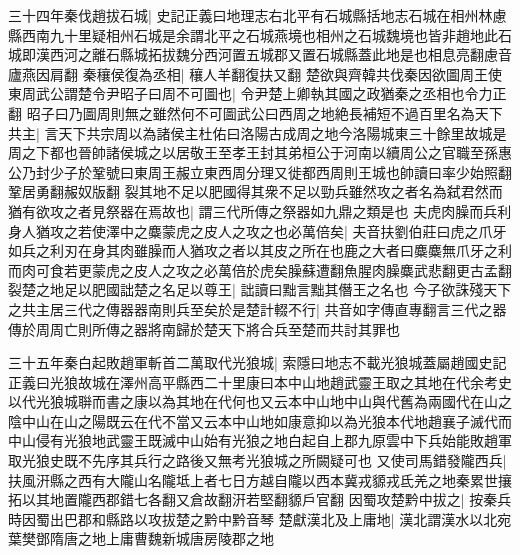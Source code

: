 三十四年秦伐趙拔石城|{
	史記正義曰地理志右北平有石城縣括地志石城在相州林慮縣西南九十里疑相州石城是余謂北平之石城燕境也相州之石城魏境也皆非趙地此石城即漢西河之離石縣城拓拔魏分西河置五城郡又置石城縣蓋此地是也相息亮翻慮音廬燕因肩翻}
秦穰侯復為丞相|{
	穰人羊翻復扶又翻}
楚欲與齊韓共伐秦因欲圖周王使東周武公謂楚令尹昭子曰周不可圖也|{
	令尹楚上卿執其國之政猶秦之丞相也令力正翻}
昭子曰乃圖周則無之雖然何不可圖武公曰西周之地絶長補短不過百里名為天下共主|{
	言天下共宗周以為諸侯主杜佑曰洛陽古成周之地今洛陽城東三十餘里故城是周之下都也晉帥諸侯城之以居敬王至孝王封其弟桓公于河南以續周公之官職至孫惠公乃封少子於鞏號曰東周王赧立東西周分理又徙都西周則王城也帥讀曰率少始照翻鞏居勇翻赧奴版翻}
裂其地不足以肥國得其衆不足以勁兵雖然攻之者名為弑君然而猶有欲攻之者見祭器在焉故也|{
	謂三代所傳之祭器如九鼎之類是也}
夫虎肉臊而兵利身人猶攻之若使澤中之麋蒙虎之皮人之攻之也必萬倍矣|{
	夫音扶劉伯莊曰虎之爪牙如兵之利刃在身其肉雖臊而人猶攻之者以其皮之所在也鹿之大者曰麋麋無爪牙之利而肉可食若更蒙虎之皮人之攻之必萬倍於虎矣臊蘇遭翻魚腥肉臊麋武悲翻更古孟翻}
裂楚之地足以肥國詘楚之名足以尊王|{
	詘讀曰黜言黜其僭王之名也}
今子欲誅殘天下之共主居三代之傳器器南則兵至矣於是楚計輟不行|{
	共音如字傳直專翻言三代之器傳於周周亡則所傳之器將南歸於楚天下將合兵至楚而共討其罪也}


三十五年秦白起敗趙軍斬首二萬取代光狼城|{
	索隱曰地志不載光狼城蓋屬趙國史記正義曰光狼故城在澤州高平縣西二十里康曰本中山地趙武靈王取之其地在代余考史以代光狼城聨而書之康以為其地在代何也又云本中山地中山與代舊為兩國代在山之陰中山在山之陽既云在代不當又云本中山地如康意抑以為光狼本代地趙襄子滅代而中山侵有光狼地武靈王既滅中山始有光狼之地白起自上郡九原雲中下兵始能敗趙軍取光狼史既不先序其兵行之路後又無考光狼城之所闕疑可也}
又使司馬錯發隴西兵|{
	扶風汧縣之西有大隴山名隴坻上者七日方越自隴以西本冀戎䝠戎氐羌之地秦累世攘拓以其地置隴西郡錯七各翻又倉故翻汧若堅翻䝠戶官翻}
因蜀攻楚黔中拔之|{
	按秦兵時因蜀出巴郡和縣路以攻拔楚之黔中黔音琴}
楚獻漢北及上庸地|{
	漢北謂漢水以北宛葉樊鄧隋唐之地上庸曹魏新城唐房陵郡之地}


